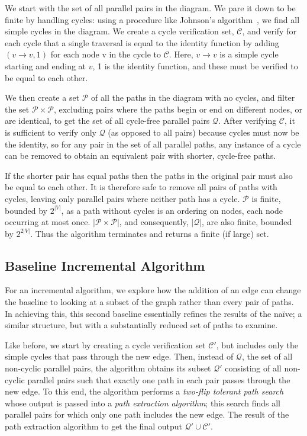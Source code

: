 \documentclass[sigplan]{acmart}
\begin{document}
We start with the set of all parallel pairs in the diagram.
We pare it down to be finite by handling cycles: using a procedure like Johnson's algorithm~\cite{johnson}, we find all simple cycles in the diagram.
We create a cycle verification set, $\mathcal{C}$, and verify for each cycle that a single traversal is equal to the identity function by adding $(v \rightarrow v, 1)$ for each node v in the cycle to $\mathcal{C}$.
Here, $v \rightarrow v$ is a simple cycle starting and ending at $v$, 1 is the identity function, and these must be verified to be equal to each other.

We then create a set $\mathcal{P}$ of all the paths in the diagram with no cycles, and filter the set $\mathcal{P} \times \mathcal{P}$, excluding pairs where the paths begin or end on different nodes, or are identical, to get the set of all cycle-free parallel pairs $\mathcal{Q}$.
After verifying $\mathcal{C}$, it is sufficient to verify only $\mathcal{Q}$ (as opposed to all pairs) because cycles must now be the identity, so for any pair in the set of all parallel paths, any instance of a cycle can be removed to obtain an equivalent pair with shorter, cycle-free paths.

If the shorter pair has equal paths then the paths in the original pair must also be equal to each other.
It is therefore safe to remove all pairs of paths with cycles, leaving only parallel pairs where neither path has a cycle.
$\mathcal{P}$ is finite, bounded by $2^{|V|}$, as a path without cycles is an ordering on nodes, each node occurring at most once.
$|\mathcal{P} \times \mathcal{P}|$, and consequently, $|\mathcal{Q}|$, are also finite, bounded by $2^{2|V|}$.
Thus the algorithm terminates and returns a finite (if large) set.

\subsection{Baseline Incremental Algorithm}

For an incremental algorithm, we explore how the addition of an edge can change the baseline to looking at a subset of the graph rather than every pair of paths.  In achieving this, this second baseline essentially refines the results of the na\"{i}ve; a similar structure, but with a substantially reduced set of paths to examine.

Like before, we start by creating a cycle verification set $\mathcal{C}'$, but includes only the simple cycles that pass through the new edge.
Then, instead of $\mathcal{Q}$, the set of all non-cyclic parallel pairs, the algorithm obtains its subset $\mathcal{Q}'$ consisting of all non-cyclic parallel pairs such that exactly one path in each pair passes through the new edge.
To this end, the algorithm performs a \textit{two-flip tolerant path search} whose output is passed into a \textit{path extraction algorithm}; this search finds all parallel pairs for which only one path includes the new edge.
The result of the path extraction algorithm to get the final output $\mathcal{Q}' \cup \mathcal{C}'$.
\end{document}
